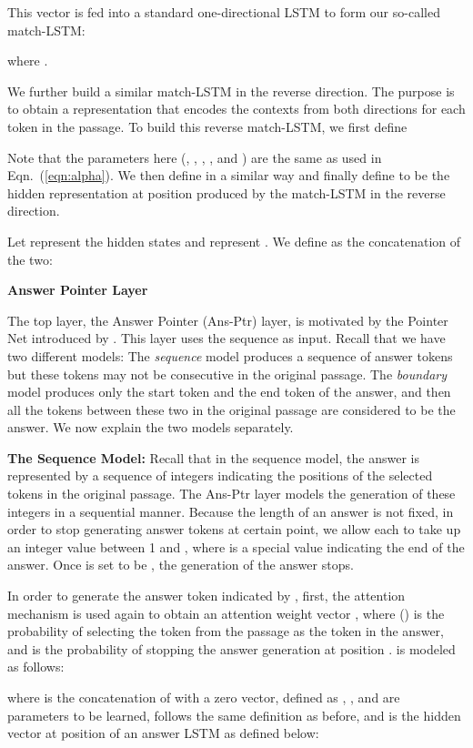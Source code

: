 \documentclass{article} \usepackage{iclr2017_conference,times}
\begin{document}
This vector  is fed into a standard one-directional LSTM to form our so-called match-LSTM:

where .

We further build a similar match-LSTM in the reverse direction.
The purpose is to obtain a representation that encodes the contexts from both directions for each token in the passage.
To build this reverse match-LSTM, we first define

Note that the parameters here (, , , ,  and ) are the same as used in Eqn.~(\ref{eqn:alpha}).
We then define  in a similar way and finally define  to be the hidden representation at position  produced by the match-LSTM in the reverse direction.

Let  represent the hidden states  and  represent .
We define  as the concatenation of the two:


\noindent \textbf{Answer Pointer Layer}

The top layer, the Answer Pointer (Ans-Ptr) layer, is motivated by the Pointer Net introduced by \citet{vinyals2015pointer:NIPS2015}.
This layer uses the sequence  as input.
Recall that we have two different models: 
The \emph{sequence} model produces a sequence of answer tokens but these tokens may not be consecutive in the original passage.
The \emph{boundary} model produces only the start token and the end token of the answer, and then all the tokens between these two in the original passage are considered to be the answer.
We now explain the two models separately.

\noindent \textbf{The Sequence Model:} Recall that in the sequence model, the answer is represented by a sequence of integers  indicating the positions of the selected tokens in the original passage.
The Ans-Ptr layer models the generation of these integers in a sequential manner.
Because the length of an answer is not fixed, in order to stop generating answer tokens at certain point, we allow each  to take up an integer value between 1 and , where  is a special value indicating the end of the answer.
Once  is set to be , the generation of the answer stops.

In order to generate the  answer token indicated by , first, the attention mechanism is used again to obtain an attention weight vector , where  () is the probability of selecting the  token from the passage as the  token in the answer, and  is the probability of stopping the answer generation at position .
 is modeled as follows:

where  is the concatenation of  with a zero vector, defined as , ,  and  are parameters to be learned,  follows the same definition as before, and  is the hidden vector at position  of an answer LSTM as defined below:
\end{document}

